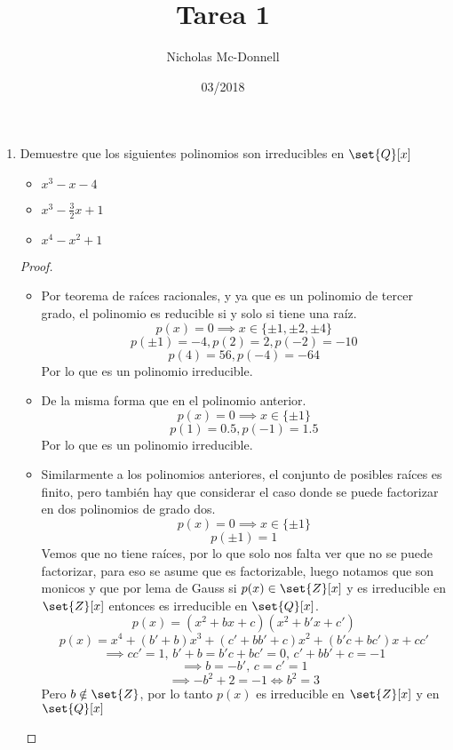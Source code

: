 \documentclass[11pt]{article}
\title{Tarea 1}
\author{Nicholas Mc-Donnell}
\date{03/2018}
\begin{document}
    \maketitle
    \begin{enumerate}
        \item Demuestre que los siguientes polinomios son irreducibles en $\set{Q}[x]$
            \begin{itemize}
                \item $x^3-x-4$
        
                \item $x^3-\frac{3}{2}x+1$
        
                \item $x^4-x^2+1$
            \end{itemize}
            \begin{proof}
                \
                \begin{itemize}
                    \item Por teorema de raíces racionales, y ya que es un polinomio de tercer grado, el polinomio es reducible si y solo si tiene una raíz.
                    \[p(x)=0\implies x\in\{\pm1,\pm2,\pm4\}\]
                    \[p(\pm 1)=-4,p(2)=2,p(-2)=-10\]
                    \[p(4)=56,p(-4)=-64\]
                    Por lo que es un polinomio irreducible.

                    \item De la misma forma que en el polinomio anterior.
                    \[p(x)=0\implies x\in\{\pm1\}\]
                    \[p(1)=0.5,p(-1)=1.5\]
                    Por lo que es un polinomio irreducible.

                    \item Similarmente a los polinomios anteriores, el conjunto de posibles raíces es finito, pero también hay que considerar el caso donde se puede factorizar en dos polinomios de grado dos. 
                    \[p(x)=0\implies x\in\{\pm1\}\]
                    \[p(\pm1)=1\]
                    Vemos que no tiene raíces, por lo que solo nos falta ver que no se puede factorizar, para eso se asume que es factorizable, luego notamos que son monicos y que por lema de Gauss si $p(x)\in\set{Z}[x]$ y es irreducible en $\set{Z}[x]$ entonces es irreducible en $\set{Q}[x]$.
                    \[p(x)=(x^2+bx+c)(x^2+b'x+c')\]
                    \[p(x)=x^4+(b'+b)x^3+(c'+bb'+c)x^2+(b'c+bc')x+cc'\]
                    \[\implies cc'=1,\,b'+b=b'c+bc'=0,\,c'+bb'+c=-1\]
                    \[\implies b=-b',\,c=c'=1\]
                    \[\implies -b^2+2=-1\iff b^2=3\]
                    Pero $b\notin\set{Z}$, por lo tanto $p(x)$ es irreducible en $\set{Z}[x]$ y en $\set{Q}[x]$
                \end{itemize}
            \end{proof}
        

\end{enumerate}
\end{document}
